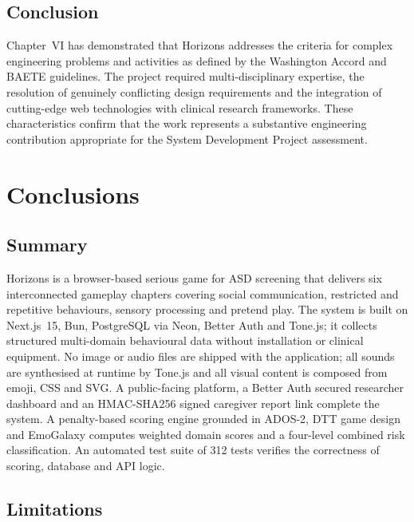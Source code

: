 \documentclass[12pt,a4paper,oneside]{report}
\begin{document}
	\section{Conclusion}
	
	Chapter~VI has demonstrated that Horizons addresses the criteria for complex engineering problems and activities as defined by the Washington Accord and BAETE guidelines. The project required multi-disciplinary expertise, the resolution of genuinely conflicting design requirements and the integration of cutting-edge web technologies with clinical research frameworks. These characteristics confirm that the work represents a substantive engineering contribution appropriate for the System Development Project assessment.
	
	\clearpage
	\chapter{Conclusions}
	
	\section{Summary}
	
	Horizons is a browser-based serious game for ASD screening that delivers six interconnected gameplay chapters covering social communication, restricted and repetitive behaviours, sensory processing and pretend play. The system is built on Next.js~15, Bun, PostgreSQL via Neon, Better Auth and Tone.js; it collects structured multi-domain behavioural data without installation or clinical equipment. No image or audio files are shipped with the application; all sounds are synthesised at runtime by Tone.js and all visual content is composed from emoji, CSS and SVG. A public-facing platform, a Better Auth secured researcher dashboard and an HMAC-SHA256 signed caregiver report link complete the system. A penalty-based scoring engine grounded in ADOS-2, DTT game design and EmoGalaxy computes weighted domain scores and a four-level combined risk classification. An automated test suite of 312 tests verifies the correctness of scoring, database and API logic.
	
	\section{Limitations}
	
\end{document}
